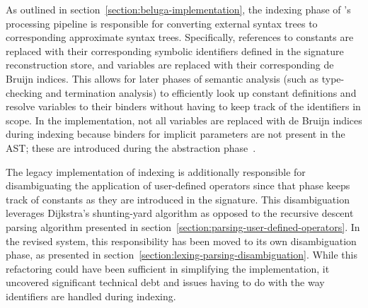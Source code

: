 As outlined in section~\ref{section:beluga-implementation}, the indexing phase of \Beluga's processing pipeline is responsible for converting external syntax trees to corresponding approximate syntax trees.
Specifically, references to constants are replaced with their corresponding symbolic identifiers defined in the signature reconstruction store, and variables are replaced with their corresponding de Bruijn indices.
This allows for later phases of semantic analysis (such as type-checking and termination analysis) to efficiently look up constant definitions and resolve variables to their binders without having to keep track of the identifiers in scope.
In the implementation, not all variables are replaced with de Bruijn indices during indexing because binders for implicit parameters are not present in the \ac{AST}; these are introduced during the abstraction phase~\cite{germain2010implementation}.



The legacy implementation of indexing is additionally responsible for disambiguating the application of user-defined operators since that phase keeps track of constants as they are introduced in the signature.
This disambiguation leverages Dijkstra's shunting-yard algorithm as opposed to the recursive descent parsing algorithm presented in section~\ref{section:parsing-user-defined-operators}.
In the revised system, this responsibility has been moved to its own disambiguation phase, as presented in section~\ref{section:lexing-parsing-disambiguation}.
While this refactoring could have been sufficient in simplifying the implementation, it uncovered significant technical debt and issues having to do with the way identifiers are handled during indexing.

